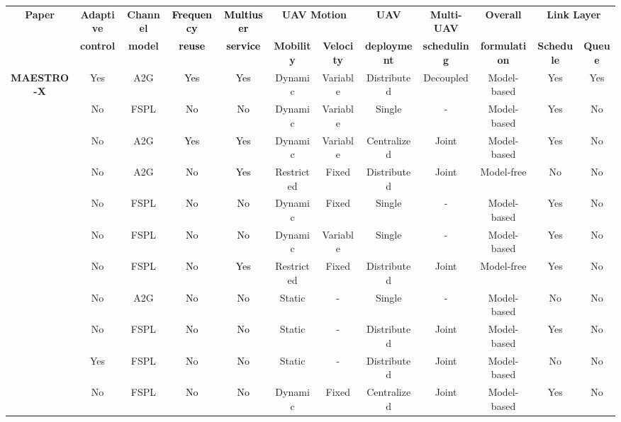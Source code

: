 \documentclass[12pt, draftcls, onecolumn]{IEEEtran}
\theoremstyle{plain}
\theoremstyle{definition}
\theoremstyle{remark}
\newcommand\hlt[1]{\textcolor{black}{#1}}
\begin{document}
\begin{table}
\begin{center}
\scriptsize
    \begin{tabular}{|*{12}{c|}}
    \hline
    	\multirow{ 2}{*}{{\bf{Paper}}} &
    	{\bf{Adaptive}} &
	\bf{Channel} &
    	\bf{\hlt{Frequency}} &
   	\bf{\hlt{Multiuser}} &
	\multicolumn{2}{c|}{\bf{UAV Motion}} &
    	\bf{UAV} &
    	\bf{Multi-UAV} &
	\bf{Overall} &
	\multicolumn{2}{c|}{\bf{Link Layer}}\\
		&
    	\bf{control} &
	\bf{model} &
    	\bf{\hlt{reuse}} &
   	\bf{\hlt{service}} &
	\bf{Mobility} & \bf{Velocity} &
    	\bf{deployment} &
    	\bf{scheduling} &
	\bf{formulation} &
	\bf{Schedule} & \bf{Queue}\\
    \hline
	{\tiny\bf MAESTRO-X} & Yes & A2G & \hlt{Yes} & \hlt{Yes} & Dynamic & Variable & Distributed & Decoupled & Model-based & Yes & Yes\\
	\hline
    \cite{SCA} & No & FSPL & \hlt{No} & \hlt{No} & Dynamic & Variable & Single & - & Model-based & Yes & No\\
    \hline
    \cite{CSCA-ADMM} & No & A2G & \hlt{Yes} & \hlt{Yes} & Dynamic & Variable & Centralized & Joint & Model-based & Yes & No\\
    \hline
    \cite{DDQN} & No & A2G & \hlt{No} & \hlt{Yes} & Restricted & Fixed & Distributed & Joint & Model-free & No & No\\
    \hline
    \cite{PAoI} & No & FSPL & \hlt{No} & \hlt{No} & Dynamic & Fixed & Single & - & Model-based & Yes & No\\
    \hline
    \cite{MEC-CVX} & No & FSPL & \hlt{No} & \hlt{No} & Dynamic & Variable & Single & - & Model-based & Yes & No\\
    \hline
    \cite{MEC-DDPG} & No & FSPL & \hlt{No} & \hlt{Yes} & Restricted & Fixed & Distributed & Joint & Model-free & Yes & No\\
    \hline
    \cite{LoSMap} & No & A2G & \hlt{No} & \hlt{No} & Static & - & Single & - & Model-based & No & No\\
    \hline
    \cite{GameTheory} & No & FSPL &\hlt{No} & \hlt{No} &  Static & - & Distributed & Joint & Model-based & Yes & No\\
    \hline
    \cite{UAVDynamicCoverage} & Yes & FSPL & \hlt{No} & \hlt{No} & Static & - & Distributed & Joint & Model-based & No & No\\
    \hline
    \cite{JointTrajectoryDesign} & No & FSPL & \hlt{No} & \hlt{No} & Dynamic & Fixed & Centralized & Joint & Model-based & Yes & No\\

\end{tabular}
\end{center}
\end{table}
\end{document}
